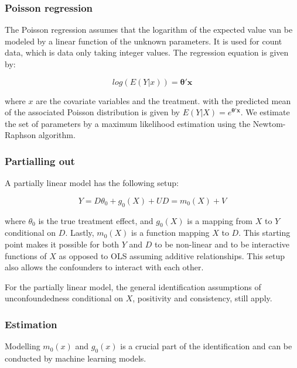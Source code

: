 \subsubsection{Poisson regression}
The Poisson regression assumes that the logarithm of the expected value van be modeled by a linear function of the
unknown parameters. It is used for count data, which is data only taking integer values. The regression equation is given
by:

\begin{equation}
    log(E(Y|x)) = \mathbf{\theta}' \mathbf{x}
\end{equation}

where $x$ are the covariate variables and the treatment.
with the predicted mean of the associated Poisson distribution is given by $E(Y|X) = e^{\mathbf{\theta}'\mathbf{x}}$.
We estimate the set of parameters by a maximum likelihood estimation using the Newtom-Raphson algorithm.

\subsubsection{Partialling out}
A partially linear model has the following setup:

\begin{equation}
    Y = D \theta_0 + g_0(X) + U
    D = m_0(X) + V
\end{equation}

where $\theta_0$ is the true treatment effect, and $g_0(X)$ is a mapping from $X$ to $Y$ conditional on $D$. Lastly,
$m_0(X)$ is a function mapping $X$ to $D$.
This starting point makes it possible for both $Y$ and $D$ to be non-linear and to be interactive functions of $X$ as
opposed to OLS assuming additive relationships. This setup also allows the confounders to interact with each other.

For the partially linear model, the general identification assumptions of unconfoundedness conditional on $X$,
positivity and consistency, still apply.

\subsubsection{Estimation}


Modelling $m_0(x)$ and $g_0(x)$ is a crucial part of the identification and can be conducted by machine learning models.

